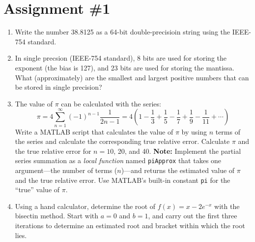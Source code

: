 \chapter{Assignment \#1}
\label{ch:ass1n}
\begin{fullwidth}

\begin{enumerate}
\item Write the number 38.8125 as a 64-bit double-precisioin string using the IEEE-754 standard. 



\vspace{2.0cm}

\item In single precsion (IEEE-754 standard), 8 bits are used for storing the exponent (the bias is 127), and 23 bits are used for storing the mantissa.  What (approximately) are the smallest and largest positive numbers that can be stored in single precision?

\vspace{2.0cm}

\item The value of $\pi$ can be calculated with the series:
\begin{equation*}
\pi = 4 \sum\limits_{n=1}^{\infty} (-1)^{n-1}\frac{1}{2n-1} = 4 \left(1 - \frac{1}{3} + \frac{1}{5} - \frac{1}{7} + \frac{1}{9} - \frac{1}{11} + \cdots \right)
\end{equation*}
Write a MATLAB script that calculates the value of $\pi$ by using $n$ terms of the series and calculate the corresponding true relative error.  Calculate $\pi$ and the true relative error for $n=10$, 20, and 40. \textbf{Note:} Implement the partial series summation as a \emph{local function} named \lstinline[style=myMatlab]{piApprox} that takes one argument---the number of terms ($n$)---and returns the estimated value of $\pi$ and the true relative error.  Use MATLAB's built-in constant \lstinline[style=myMatlab]{pi} for the ``true'' value of $\pi$.

\vspace{2.0cm}

\item Using a hand calculator, determine the root of $f(x)=x-2e^{-x}$ with the bisectin method.  Start with $a=0$ and $b=1$, and carry out the first three iterations to determine an estimated root and bracket within which the root lies.

\vspace{2.0cm}


\end{enumerate}
\end{fullwidth}
